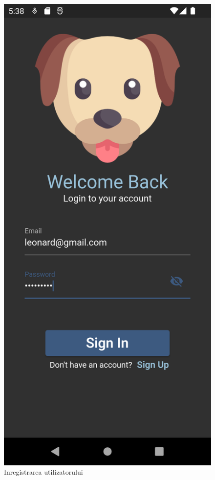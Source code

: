 \begin{figure}[!htb]
      \caption{Inregistrarea utilizatorului}\label{fig:register}
    \endminipage\hfill
      \includegraphics[width=\linewidth]{images/screenshots/login.png}

\end{figure}
